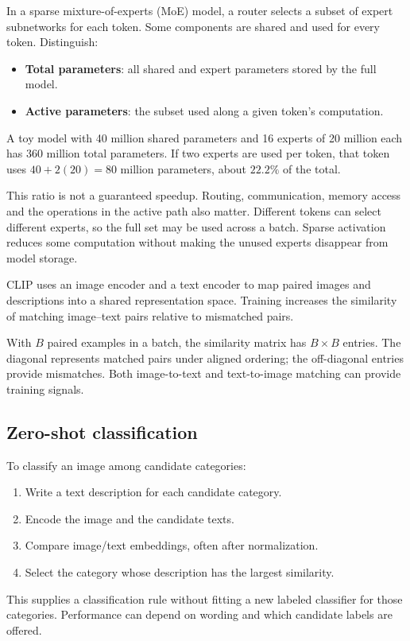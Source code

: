 \documentclass[11pt]{article}
\begin{document}
In a sparse mixture-of-experts (MoE) model, a router selects a subset of expert subnetworks for each token. Some components are shared and used for every token. Distinguish:
\begin{itemize}
\item \textbf{Total parameters}: all shared and expert parameters stored by the full model.
\item \textbf{Active parameters}: the subset used along a given token's computation.
\end{itemize}
A toy model with 40 million shared parameters and 16 experts of 20 million each has 360 million total parameters. If two experts are used per token, that token uses $40+2(20)=80$ million parameters, about $22.2\%$ of the total.

This ratio is not a guaranteed speedup. Routing, communication, memory access and the operations in the active path also matter. Different tokens can select different experts, so the full set may be used across a batch. Sparse activation reduces some computation without making the unused experts disappear from model storage.

CLIP uses an image encoder and a text encoder to map paired images and descriptions into a shared representation space. Training increases the similarity of matching image--text pairs relative to mismatched pairs.

With $B$ paired examples in a batch, the similarity matrix has $B\times B$ entries. The diagonal represents matched pairs under aligned ordering; the off-diagonal entries provide mismatches. Both image-to-text and text-to-image matching can provide training signals.

\subsection{Zero-shot classification}
To classify an image among candidate categories:
\begin{enumerate}
\item Write a text description for each candidate category.
\item Encode the image and the candidate texts.
\item Compare image/text embeddings, often after normalization.
\item Select the category whose description has the largest similarity.
\end{enumerate}
This supplies a classification rule without fitting a new labeled classifier for those categories. Performance can depend on wording and which candidate labels are offered.
\end{document}
